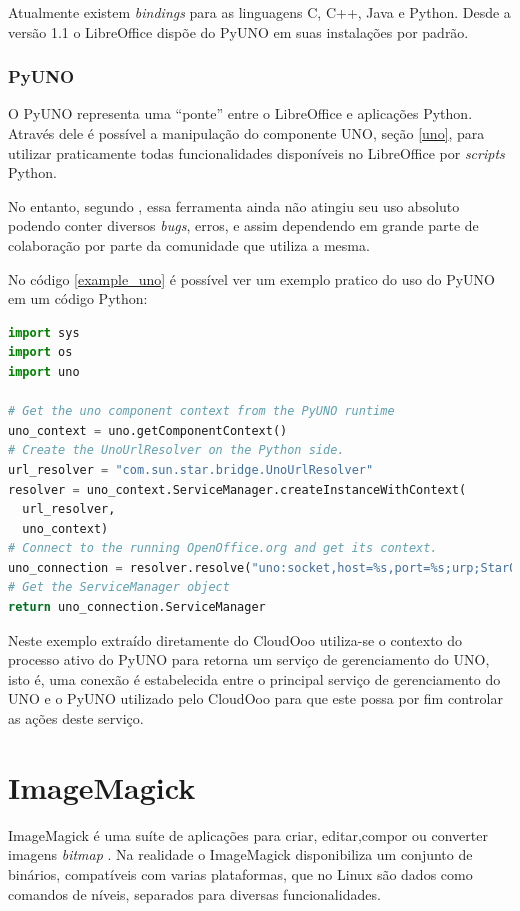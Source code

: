 Atualmente existem \textit{bindings} para as linguagens C, C++, Java e Python. Desde a versão 1.1 o LibreOffice dispõe do PyUNO em suas instalações por padrão.

\subsubsection{PyUNO}
\label{pyuno}

O PyUNO representa uma ``ponte'' entre o LibreOffice e aplicações Python. Através dele é possível a manipulação do componente UNO, seção \ref{uno}, para utilizar praticamente todas funcionalidades disponíveis no LibreOffice por \textit{scripts} Python.

No entanto, segundo \cite{PYUNO}, essa ferramenta ainda não atingiu seu uso absoluto podendo conter diversos \textit{bugs}, erros, e assim dependendo em grande parte de colaboração por parte da comunidade que utiliza a mesma.

No código \ref{example_uno} é possível ver um exemplo pratico do uso do PyUNO em um código Python:

{\singlespace
\begin{lstlisting}[caption=Exemplo de uso do Uno,language=python,label={example_uno}]
import sys
import os
import uno

# Get the uno component context from the PyUNO runtime
uno_context = uno.getComponentContext()
# Create the UnoUrlResolver on the Python side.
url_resolver = "com.sun.star.bridge.UnoUrlResolver"
resolver = uno_context.ServiceManager.createInstanceWithContext(
  url_resolver,
  uno_context)
# Connect to the running OpenOffice.org and get its context.
uno_connection = resolver.resolve("uno:socket,host=%s,port=%s;urp;StarOffice.ComponentContext" % (host, port))
# Get the ServiceManager object
return uno_connection.ServiceManager
\end{lstlisting}
}

Neste exemplo extraído diretamente do CloudOoo utiliza-se o contexto do processo ativo do PyUNO para retorna um serviço de gerenciamento do UNO, isto é, uma conexão é estabelecida entre o principal serviço de gerenciamento do UNO e o PyUNO utilizado pelo CloudOoo para que este possa por fim controlar as ações deste serviço.


\section{ImageMagick}
\label{imagemagick}

ImageMagick é uma suíte de aplicações para criar, editar,compor ou converter imagens \textit{bitmap} \cite{IMAGEMAGICK-STUDIO}.
Na realidade o ImageMagick disponibiliza um conjunto de binários, compatíveis com varias plataformas, que no Linux são dados como comandos de níveis, separados para diversas funcionalidades.

